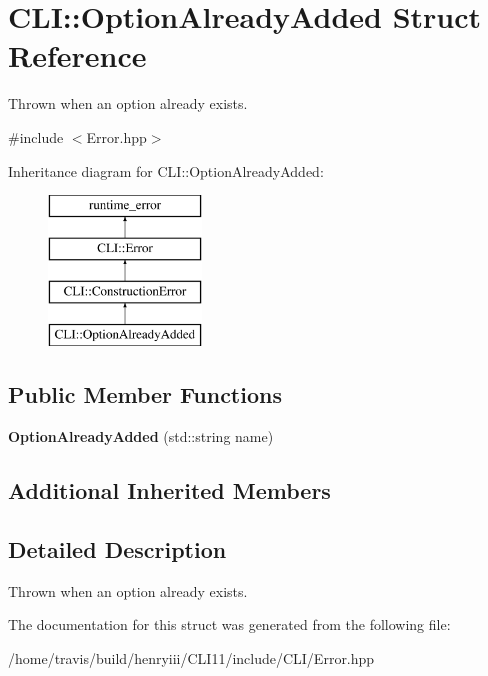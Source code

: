 \hypertarget{struct_c_l_i_1_1_option_already_added}{}\section{C\+LI\+:\+:Option\+Already\+Added Struct Reference}
\label{struct_c_l_i_1_1_option_already_added}


Thrown when an option already exists.  




{\ttfamily \#include $<$Error.\+hpp$>$}

Inheritance diagram for C\+LI\+:\+:Option\+Already\+Added\+:\begin{figure}[H]
\begin{center}
\leavevmode
\includegraphics[height=4.000000cm]{struct_c_l_i_1_1_option_already_added}
\end{center}
\end{figure}
\subsection*{Public Member Functions}
\begin{DoxyCompactItemize}
\item 
\mbox{\label{struct_c_l_i_1_1_option_already_added_a2157496f3b017fa4894fd4950206101c}} 
{\bfseries Option\+Already\+Added} (std\+::string name)
\end{DoxyCompactItemize}
\subsection*{Additional Inherited Members}


\subsection{Detailed Description}
Thrown when an option already exists. 

The documentation for this struct was generated from the following file\+:\begin{DoxyCompactItemize}
\item 
/home/travis/build/henryiii/\+C\+L\+I11/include/\+C\+L\+I/Error.\+hpp\end{DoxyCompactItemize}
